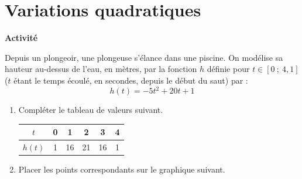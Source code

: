
\chapter{Variations quadratiques}

\noindent\textbf{Activité}

Depuis un plongeoir, une plongeuse s'élance dans une piscine. On modélise sa hauteur au-dessus de l'eau, en mètres, par la fonction $h$ définie pour $t\in[0\ ;\ 4,1]$ ($t$ étant le temps écoulé, en secondes, depuis le début du saut) par :
\[h(t)=-5t^2+20t+1\]

\begin{enumerate}
    \item Compléter le tableau de valeurs suivant.

    \begin{center}
        \begin{tabular}{|c|c|c|c|c|c|}
            \hline
            $t$ & 0 & 1 & 2 & 3 & 4 \\
            \hline
            $h(t)$ & \textcolor{J1}{1} & \textcolor{J1}{16} & \textcolor{J1}{21} & \textcolor{J1}{16} & \textcolor{J1}{1} \\
            \hline
        \end{tabular}
    \end{center}

    \item Placer les points correspondants sur le graphique suivant.

    \begin{center}
    \end{center}


\end{enumerate}
